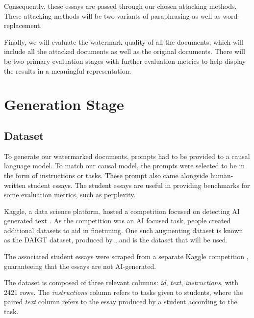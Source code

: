 \documentclass{l4proj}
\theoremstyle{definition}
\begin{document}
    Consequently, these essays are passed through our chosen attacking methods. These attacking methods will be two variants of paraphrasing as well as word-replacement. 

    Finally, we will evaluate the watermark quality of all the documents, which will include all the attacked documents as well as the original documents. There will be two primary evaluation stages with further evaluation metrics to help display the results in a meaningful representation.

\section{Generation Stage}
    \subsection{Dataset}    
        To generate our watermarked documents, prompts had to be provided to a causal language model. To match our causal model, the prompts were selected to be in the form of instructions or tasks. These prompt also came alongside human-written student essays. The student essays are useful in providing benchmarks for some evaluation metrics, such as perplexity.
    
        Kaggle, a data science platform, hosted a competition focused on detecting AI generated text \citep{llm-detect-ai-generated-text}. As the competition was an AI focused task, people created additional datasets to aid in finetuning. One such augmenting dataset is known as the DAIGT dataset, produced by \citet{Paullier2023-rx}, and is the dataset that will be used.

        The associated student essays were scraped from a separate Kaggle competition \citep{feedback-prize-english-language-learning}, guaranteeing that the essays are not AI-generated.

        The dataset is composed of three relevant columns: \emph{id}, \emph{text}, \emph{instructions}, with 2421 rows. The \emph{instructions} column refers to tasks given to students, where the paired \emph{text} column refers to the essay produced by a student according to the task.
\end{document}
